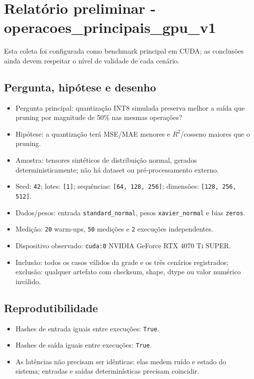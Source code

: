 \chapter{Relatório preliminar - operacoes\_\allowbreak{}principais\_\allowbreak{}gpu\_\allowbreak{}v1}

\begin{icquote}
Esta coleta foi configurada como benchmark principal em CUDA; as conclusões ainda devem respeitar o nível de validade de cada cenário.
\end{icquote}

\section{Pergunta, hipótese e desenho}

\begin{itemize}
\item Pergunta principal: quantização INT8 simulada preserva melhor a saída que pruning por magnitude de 50\% nas mesmas operações?
\item Hipótese: a quantização terá MSE/MAE menores e $R^2$/cosseno maiores que o pruning.
\item Amostra: tensores sintéticos de distribuição normal, gerados deterministicamente; não há dataset ou pré-processamento externo.
\item Seed: \texttt{42}; lotes: \texttt{[1]}; sequências: \texttt{[64, 128, 256]}; dimensões: \texttt{[128, 256, 512]}.
\item Dados/pesos: entrada \texttt{standard\_\allowbreak{}normal}, pesos \texttt{xavier\_\allowbreak{}normal} e bias \texttt{zeros}.
\item Medição: \texttt{20} warm-ups, \texttt{50} medições e \texttt{2} execuções independentes.
\item Dispositivo observado: \texttt{cuda:0} NVIDIA GeForce RTX 4070 Ti SUPER.
\item Inclusão: todos os casos válidos da grade e os três cenários registrados; exclusão: qualquer artefato com checksum, shape, dtype ou valor numérico inválido.
\end{itemize}

\section{Reprodutibilidade}

\begin{itemize}
\item Hashes de entrada iguais entre execuções: \texttt{True}.
\item Hashes de saída iguais entre execuções: \texttt{True}.
\item As latências não precisam ser idênticas: elas medem ruído e estado do sistema; entradas e saídas determinísticas precisam coincidir.
\end{itemize}


